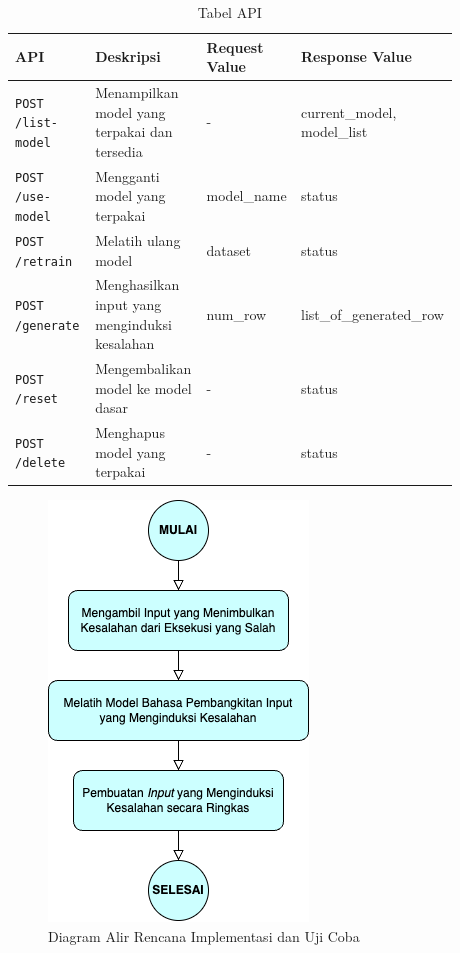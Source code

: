 \begin{table}[H]
  \centering
  \caption{Tabel API}
  \begin{tabular}{|p{0.18\linewidth}|p{0.25\linewidth}|p{0.17\linewidth}|p{0.28\linewidth}|}
    \hline
    \textbf{API} & \textbf{Deskripsi} & \textbf{Request Value}  & \textbf{Response Value} \\
    \hline
    \raggedright \texttt{POST /list-model} &\raggedright Menampilkan model yang terpakai dan tersedia & - &  current\_model, model\_list \\
    \hline
    \raggedright \texttt{POST /use-model} &\raggedright Mengganti model yang terpakai & model\_name & status \\
    \hline
    \texttt{POST /retrain} &\raggedright Melatih ulang model & dataset & status \\
    \hline
    \raggedright \texttt{POST /generate} &\raggedright Menghasilkan input yang menginduksi kesalahan & num\_row & list\_of\_generated\_row \\
    \hline
    \texttt{POST /reset} &\raggedright Mengembalikan model ke model dasar & - & status \\
    \hline
    \texttt{POST /delete} &\raggedright Menghapus model yang terpakai & - & status \\
    \hline
  \end{tabular}
  \label{tab:api}
\end{table}

\begin{figure}[H]
  \centering
  \includegraphics[scale=0.8]{gambar/DiagramAlirRencanaImplementasiDanUjiCoba.png}

  \caption{Diagram Alir Rencana Implementasi dan Uji Coba}
  \label{fig:diagram alir implementasi}
\end{figure}

